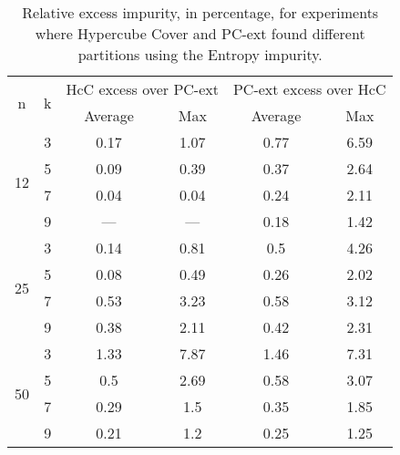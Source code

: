 \begin{table}
\centering
\begin{tabular}{c|c|c|c|c|c} 
\multirow{2}{*}{n}   & \multirow{2}{*}{k}  &   \multicolumn{2}{c|}{HcC excess over PC-ext} &  \multicolumn{2}{c}{PC-ext excess over HcC}   \\
                     &                     &   Average           &    Max                  &   Average           &    Max                  \\
\hline
\multirow{4}{*}{12}  &    3                &   0.17              &   1.07                  &   0.77              &  6.59                   \\
                     &    5                &   0.09              &   0.39                  &   0.37              &  2.64                   \\
                     &    7                &   0.04              &   0.04                  &   0.24              &  2.11                   \\
                     &    9                &   ---               &   ---                   &   0.18              &  1.42                   \\
\hline
\multirow{4}{*}{25}  &    3                &   0.14              &   0.81                  &   0.5               &  4.26                   \\
                     &    5                &   0.08              &   0.49                  &   0.26              &  2.02                   \\
                     &    7                &   0.53              &   3.23                  &   0.58              &  3.12                   \\
                     &    9                &   0.38              &   2.11                  &   0.42              &  2.31                   \\
\hline
\multirow{4}{*}{50}  &    3                &   1.33              &   7.87                  &   1.46              &  7.31                   \\
                     &    5                &   0.5               &   2.69                  &   0.58              &  3.07                   \\
                     &    7                &   0.29              &   1.5                   &   0.35              &  1.85                   \\
                     &    9                &   0.21              &   1.2                   &   0.25              &  1.25
\end{tabular}
\caption{Relative excess impurity, in percentage, for experiments where Hypercube Cover and PC-ext found different partitions using the Entropy impurity.}
\label{tab:Relative-Excess-Entropy}
\end{table}


